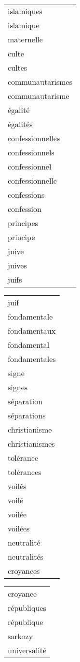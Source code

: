 \begin{table}[h]
\begin{center}
\begin{tabular}{|l|}
\hline
islamiques\\
islamique\\
maternelle\\
culte\\
cultes\\
communautarismes\\
communautarisme\\
égalité\\
égalités\\
confessionnelles\\
confessionnels\\
confessionnel\\
confessionnelle\\
confessions\\
confession\\
principes\\
principe\\
juive\\
juives\\
juifs\\
\hline
	\end{tabular}
	\begin{tabular}{|l|}
\hline
juif\\
fondamentale\\
fondamentaux\\
fondamental\\
fondamentales\\
signe\\
signes\\
séparation\\
séparations\\
christianisme\\
christianismes\\
tolérance\\
tolérances\\
voilés\\
voilé\\
voilée\\
voilées\\
neutralité\\
neutralités\\
croyances\\
\hline
	\end{tabular}
	\begin{tabular}{|l|}
\hline
croyance\\
républiques\\
république\\
sarkozy\\
universalité\\

\end{tabular}
\end{center}
\end{table}
